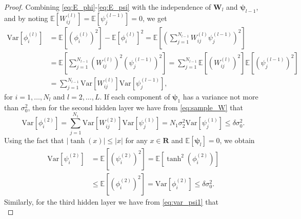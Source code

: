 \documentclass{article}
\newcommand{\bW}{\mathbf{W}}
\newcommand{\vpsi}{\boldsymbol{\psi}}
\begin{document}
\begin{proof}


Combining  \eqref{eq:E_phi}-\eqref{eq:E_psi} with the independence of $\bW_l$ and $\vpsi_{l-1}$, and by noting $\mathbb{E}\left[W_{ij}^{(l)}\right] = \mathbb{E}\left[\psi_{j}^{(l-1)}\right] = 0$,  we get 
\begin{equation}\label{eq:var_phi} 
   \begin{aligned}
       \mathrm{Var}\left[\phi_i^{(l)}\right] &= \mathbb{E}\left[\left(\phi_i^{(l)}\right)^2\right] - \mathbb{E}\left[\phi_i^{(l)}\right]^2 
       = \textstyle\mathbb{E}\left[\left(\sum\limits_{j=1}^{N_{l-1}} W_{ij}^{(l)}\psi_{j}^{(l-1)}\right)^2\right] \\
       &=\textstyle \mathbb{E}\left[\sum\limits_{j=1}^{N_{l-1}} \left(W_{ij}^{(l)}\right)^2 \left(\psi_{j}^{(l-1)}\right)^2\right] 
       = \textstyle\sum\limits_{j=1}^{N_{l-1}} \mathbb{E}\left[\left(W_{ij}^{(l)}\right)^2\right] \mathbb{E}\left[\left(\psi_{j}^{(l-1)}\right)^2\right]\\
       &= \sum_{j=1}^{N_{l-1}}\mathrm{Var}\left[W_{ij}^{(l)}\right]\mathrm{Var}\left[\psi_j^{(l-1)}\right],
   \end{aligned}
   \end{equation}
for  $i=1,\dots,N_l$ and $l=2,\dots,L$.
If each component of $\vpsi_1$ has a variance not more than $\sigma_0^2$, then for the second hidden layer we have from \eqref{eq:sample_W} that
\begin{equation}
\mathrm{Var}\left[\phi_i^{(2)}\right] 
= \textstyle\sum\limits_{j=1}^{N_1}\mathrm{Var}\left[W_{ij}^{(2)}\right]\mathrm{Var}\left[\psi_j^{(1)}\right]
= N_{1} \sigma_2^2 \mathrm{Var}\left[\psi_{j}^{(1)}\right]
        \leq \delta \sigma_0^2.
\end{equation}
Using the fact that $|\tanh(x)| \le |x|$ for any $x\in{\mathbf R}$ and $\mathbb{E}[\vpsi_l]=0$, we obtain 
\begin{equation}\label{eq:var_psi1}
\begin{aligned}
\mathrm{Var}\left[\psi_i^{(2)}\right]
&= \mathbb{E}\left[\left(\psi_i^{(2)}\right)^2\right]
= \mathbb{E}\left[\tanh^2\left(\phi_i^{(2)}\right)\right] \\
&\le \mathbb{E}\left[\left(\phi_i^{(2)}\right)^2\right]
= \mathrm{Var}\left[\phi_i^{(2)}\right] 
\leq \delta \sigma_0^2.
\end{aligned}
\end{equation}
Similarly, for the third hidden layer we have from 
\eqref{eq:var_psi1} that
\begin{equation}

\end{equation}
\end{proof}
\end{document}
